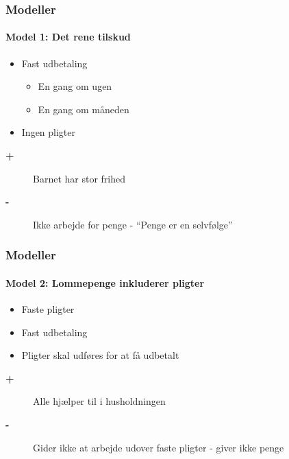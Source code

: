 
\newcommand{\fordel}[1]{ %
\begin{description}\item[\color{green}\textbf{+}]{#1}\end{description}
}

\newcommand{\ulempe}[1]{ %
\begin{description}\item[\color{red}\textbf{-}]{#1}\end{description}
}

\newcommand{\headercell}[1]{ %
\cellcolor{aauprimary}\color{white}\small\textbf{{#1}}
}

\begin{frame}
\frametitle{Modeller}
\framesubtitle{\textbf{Model 1:} Det rene tilskud} 
    \begin{itemize}
        \item{Fast udbetaling}
            \begin{itemize}
                \item{En gang om ugen}
                \item{En gang om måneden}
            \end{itemize}
        \item{Ingen pligter} 
    \end{itemize}
    \vspace{\baselineskip}
    \pause
    \fordel{Barnet har stor frihed}
    \ulempe{Ikke arbejde for penge - ``Penge er en selvfølge''}
\end{frame}

\begin{frame}
\frametitle{Modeller}
\framesubtitle{\textbf{Model 2:} Lommepenge inkluderer pligter}
    \begin{itemize}
        \item{Faste pligter}
        \item{Fast udbetaling}
        \item{Pligter skal udføres for at få udbetalt}
    \end{itemize}
    \vspace{\baselineskip}
    \pause
    \fordel{Alle hjælper til i husholdningen}
    \ulempe{Gider ikke at arbejde udover faste pligter - giver ikke penge}
\end{frame}

